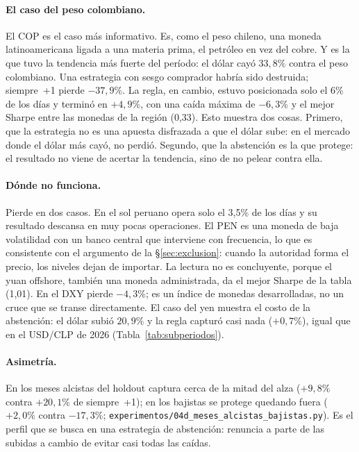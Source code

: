\documentclass[10pt,a4paper]{article}
\newcommand{\ruta}[1]{\nolinkurl{#1}}
\begin{document}
\paragraph{El caso del peso colombiano.} El COP es el caso más informativo. Es,
como el peso chileno, una moneda latinoamericana ligada a una materia prima, el
petróleo en vez del cobre. Y es la que tuvo la tendencia más fuerte del período:
el dólar cayó $33{,}8\%$ contra el peso colombiano. Una estrategia con sesgo
comprador habría sido destruida; siempre~+1 pierde $-37{,}9\%$. La regla, en
cambio, estuvo posicionada solo el 6\% de los días y terminó en $+4{,}9\%$, con una
caída máxima de $-6{,}3\%$ y el mejor Sharpe entre las monedas de la región
(0,33). Esto muestra dos cosas. Primero, que la estrategia no es una apuesta
disfrazada a que el dólar sube: en el mercado donde el dólar más cayó, no perdió.
Segundo, que la abstención es la que protege: el resultado no viene de acertar la
tendencia, sino de no pelear contra ella.

\paragraph{Dónde no funciona.} Pierde en dos casos. En el sol peruano opera solo
el 3,5\% de los días y su resultado descansa en muy pocas operaciones. El PEN es
una moneda de baja volatilidad con un banco central que interviene con frecuencia,
lo que es consistente con el argumento de la §\ref{sec:exclusion}: cuando la
autoridad forma el precio, los niveles dejan de importar. La lectura no es
concluyente, porque el yuan offshore, también una moneda administrada, da el mejor
Sharpe de la tabla (1,01). En el DXY pierde $-4{,}3\%$; es un índice de monedas
desarrolladas, no un cruce que se transe directamente. El caso del yen muestra el
costo de la abstención: el dólar subió $20{,}9\%$ y la regla capturó casi nada
($+0{,}7\%$), igual que en el USD/CLP de 2026 (Tabla~\ref{tab:subperiodos}).

\paragraph{Asimetría.} En los meses alcistas del holdout captura cerca de la mitad
del alza ($+9{,}8\%$ contra $+20{,}1\%$ de siempre~+1); en los bajistas se protege
quedando fuera ($+2{,}0\%$ contra $-17{,}3\%$; \ruta{experimentos/04d_meses_alcistas_bajistas.py}). Es el perfil que se busca en una
estrategia de abstención: renuncia a parte de las subidas a cambio de evitar casi
todas las caídas.
\end{document}
